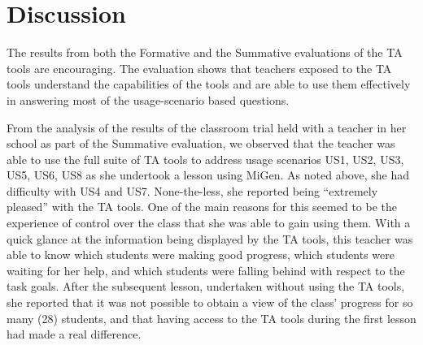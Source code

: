 \section{Discussion}
\label{sec:discussion}

The results from both the Formative and the Summative evaluations of
the TA tools are encouraging. The evaluation shows that teachers
exposed to the TA tools understand the capabilities of
the tools and are able to use them effectively in answering most
of the usage-scenario based questions. 
% 
%


From the analysis of the results of the classroom trial held with a
teacher in her school as part of the Summative evaluation,
we observed that the teacher was able to use the full suite of TA
tools to address usage scenarios US1, US2, US3, US5, US6, US8 as she undertook a
lesson using MiGen. As noted above, she had difficulty with US4 and US7.
None-the-less, she reported being ``extremely pleased'' with the TA tools. 
One of the main reasons for this seemed to be the experience of control over the class
that she was able to gain using them. With a quick glance at the information being
displayed by the TA tools, this teacher was able to know which students
were making good progress, which students were waiting for her help,
and which students were falling behind with respect to the task goals.
After the subsequent lesson, undertaken without using the TA tools,
she reported that it was not possible to obtain a view
of the class' progress for so many (28) students, 
and that having access to the TA tools during the first lesson 
had made a real difference. 

